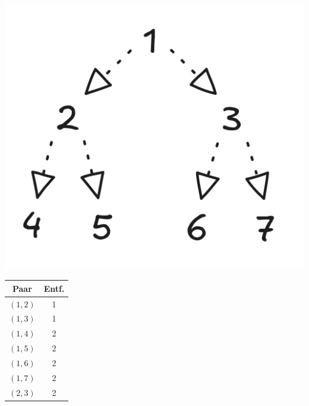 \begin{enumerate}
        \begin{minipage}{0.24\linewidth}
            \centering
            \includegraphics[width=1\textwidth]{./assets/1.7.a.png}
        \end{minipage}
        \begin{minipage}{0.24\linewidth}
            \centering
            \begin{tabular}{|c|c|}
                \hline
                Paar & Entf. \\
                \hline
                $(1, 2)$    & 1         \\
                \hline
                $(1, 3)$    & 1         \\
                \hline
                $(1, 4)$    & 2         \\
                \hline
                $(1, 5)$    & 2         \\
                \hline
                $(1, 6)$    & 2         \\
                \hline
                $(1, 7)$    & 2         \\
                \hline
                $(2, 3)$    & 2         \\
                \hline
            \end{tabular}
        \end{minipage}
        \begin{minipage}{0.24\linewidth}
            \centering
            \begin{tabular}{|c|c|}

\end{tabular}
\end{minipage}
\end{enumerate}
